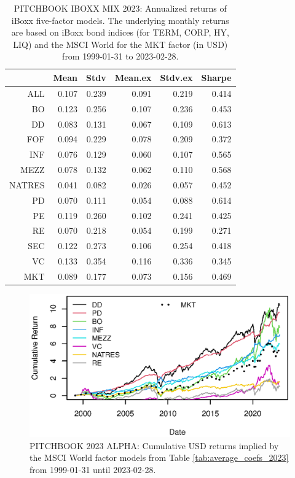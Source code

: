 \begin{table}[ht]
	\centering
	\begin{tabular}{rrrrrr}
		& Mean & Stdv & Mean.ex & Stdv.ex & Sharpe \\ 
		\hline
		\hline
		ALL & 0.107 & 0.239 & 0.091 & 0.219 & 0.414 \\ 
		BO & 0.123 & 0.256 & 0.107 & 0.236 & 0.453 \\ 
		DD & 0.083 & 0.131 & 0.067 & 0.109 & 0.613 \\ 
		FOF & 0.094 & 0.229 & 0.078 & 0.209 & 0.372 \\ 
		INF & 0.076 & 0.129 & 0.060 & 0.107 & 0.565 \\ 
		MEZZ & 0.078 & 0.132 & 0.062 & 0.110 & 0.568 \\ 
		NATRES & 0.041 & 0.082 & 0.026 & 0.057 & 0.452 \\ 
		PD & 0.070 & 0.111 & 0.054 & 0.088 & 0.614 \\ 
		PE & 0.119 & 0.260 & 0.102 & 0.241 & 0.425 \\ 
		RE & 0.070 & 0.218 & 0.054 & 0.199 & 0.271 \\ 
		SEC & 0.122 & 0.273 & 0.106 & 0.254 & 0.418 \\ 
		VC & 0.133 & 0.354 & 0.116 & 0.336 & 0.345 \\ 
		\hline
		MKT & 0.089 & 0.177 & 0.073 & 0.156 & 0.469 \\ 
		\hline
		\hline
	\end{tabular}
	\caption{
		PITCHBOOK IBOXX MIX 2023:
		Annualized returns of iBoxx five-factor models.
		The underlying monthly returns are based on iBoxx bond indices (for TERM, CORP, HY, LIQ) and the MSCI World for the MKT factor (in USD) from 1999-01-31 to 2023-02-28.
	} 
	\label{tab:ann_returns_iboxx}
\end{table}
\fi

\clearpage


\begin{figure}[H]
	\centering
	\includegraphics{Figures/Cumulative_Returns_2023_Alpha.eps}
	\caption{PITCHBOOK 2023 ALPHA: Cumulative USD returns implied by the MSCI World factor models from Table \ref{tab:average_coefs_2023} from 1999-01-31 until 2023-02-28.}
	\label{fig:cum_returns_2023_alpha}   
\end{figure}


